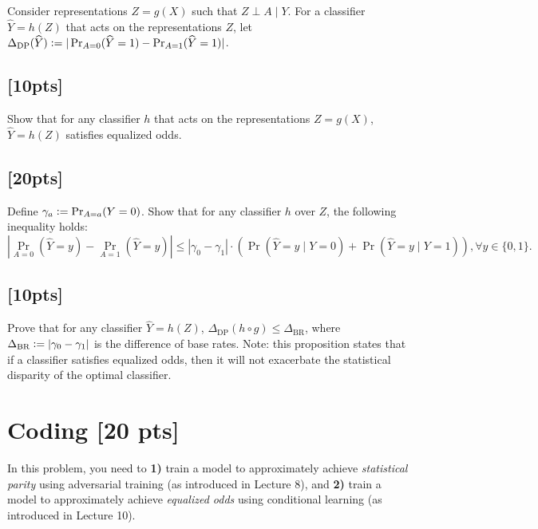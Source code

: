 \documentclass[letterpaper,11pt]{article}
\theoremstyle{definition}
\newcommand{\defeq}{\vcentcolon=}
\begin{document}
	Consider representations $Z = g(X)$ such that $Z\perp A \mid Y$. For a classifier $\widehat{Y} = h(Z)$ that acts on the representations $Z$, let $\Delta_{\text{DP}}(\widehat{Y})\defeq |\Pr_{A = 0}(\widehat{Y} = 1) - \Pr_{A = 1}(\widehat{Y} = 1)|$.
	
	\subsection{[10pts]}
	Show that for any classifier $h$ that acts on the representations $Z = g(X)$, $\widehat{Y} = h(Z)$ satisfies equalized odds.
	
	\subsection{[20pts]}
	Define $\gamma_a \defeq \Pr_{A= a}(Y =0)$. Show that for any classifier $h$ over $Z$, the following inequality holds:
	\begin{equation*}
		\left|\Pr_{A = 0}(\widehat{Y} = y) - \Pr_{A = 1}(\widehat{Y} = y)\right|\leq |\gamma_0 - \gamma_1|\cdot \left(\Pr(\widehat{Y} = y\mid Y = 0) + \Pr(\widehat{Y} = y\mid Y = 1)\right), \forall y\in\{0, 1\}.
	\end{equation*}
	
	\subsection{[10pts]}
	Prove that for any classifier $\widehat{Y} = h(Z)$, $\Delta_{\text{DP}}(h\circ g)\leq \Delta_{\text{BR}}$, where $\Delta_{\text{BR}}\defeq |\gamma_0 - \gamma_1|$ is the difference of base rates. Note: this proposition states that if a classifier satisfies equalized odds, then it will not exacerbate the statistical disparity of the optimal classifier.
	
	
	\section{Coding [20 pts]}
	In this problem, you need to \textbf{1)} train a model to approximately achieve \textit{statistical parity} using adversarial training (as introduced in Lecture 8), and \textbf{2)} train a model to approximately achieve \textit{equalized odds} using conditional learning (as introduced in Lecture 10).
	
\end{document}
